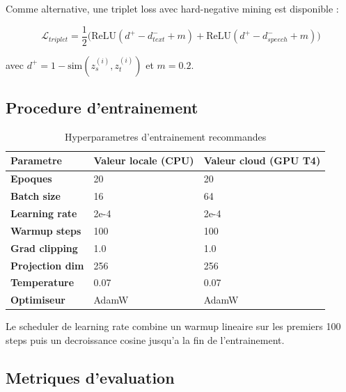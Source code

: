 \documentclass[12pt, a4paper]{article}
\begin{document}
Comme alternative, une triplet loss avec hard-negative mining est disponible :

\begin{equation}
  \mathcal{L}_{triplet} = \frac{1}{2}\Big(
  \text{ReLU}\!\left(d^+ - d^-_{text} + m\right)
  + \text{ReLU}\!\left(d^+ - d^-_{speech} + m\right)
  \Big)
\end{equation}

avec $d^+ = 1 - \text{sim}(z_s^{(i)}, z_t^{(i)})$ et $m = 0.2$.

\subsection{Procedure d'entrainement}

\begin{table}[H]
\centering
\caption{Hyperparametres d'entrainement recommandes}
\begin{tabular}{>{\bfseries}l l l}
\toprule
Parametre & Valeur locale (CPU) & Valeur cloud (GPU T4) \\
\midrule
Epoques          & 20      & 20 \\
\rowcolor{silver}
Batch size       & 16      & 64 \\
Learning rate    & 2e-4    & 2e-4 \\
\rowcolor{silver}
Warmup steps     & 100     & 100 \\
Grad clipping    & 1.0     & 1.0 \\
\rowcolor{silver}
Projection dim   & 256     & 256 \\
Temperature      & 0.07    & 0.07 \\
\rowcolor{silver}
Optimiseur       & AdamW   & AdamW \\
\bottomrule
\end{tabular}
\end{table}

Le scheduler de learning rate combine un warmup lineaire sur les premiers 100 steps
puis un decroissance cosine jusqu'a la fin de l'entrainement.

\subsection{Metriques d'evaluation}
\end{document}
